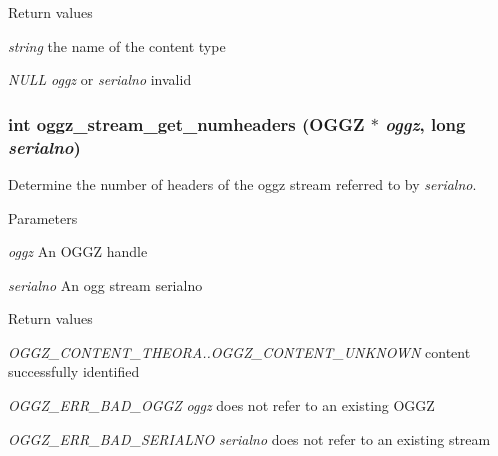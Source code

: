 \begin{DoxyRetVals}{Return values}
\item[{\em string}]the name of the content type \item[{\em NULL}]{\itshape oggz\/} or {\itshape serialno\/} invalid \end{DoxyRetVals}
\subsubsection[{oggz\_\-stream\_\-get\_\-numheaders}]{\setlength{\rightskip}{0pt plus 5cm}int oggz\_\-stream\_\-get\_\-numheaders ({\bf OGGZ} $\ast$ {\em oggz}, \/  long {\em serialno})}\label{oggz__stream_8h_ae3b1aa364b5bf0d7b331aab70646ab10}


Determine the number of headers of the oggz stream referred to by {\itshape serialno\/}. 


\begin{DoxyParams}{Parameters}
\item[{\em oggz}]An OGGZ handle \item[{\em serialno}]An ogg stream serialno \end{DoxyParams}

\begin{DoxyRetVals}{Return values}
\item[{\em OGGZ\_\-CONTENT\_\-THEORA..OGGZ\_\-CONTENT\_\-UNKNOWN}]content successfully identified \item[{\em OGGZ\_\-ERR\_\-BAD\_\-OGGZ}]{\itshape oggz\/} does not refer to an existing OGGZ \item[{\em OGGZ\_\-ERR\_\-BAD\_\-SERIALNO}]{\itshape serialno\/} does not refer to an existing stream \end{DoxyRetVals}
